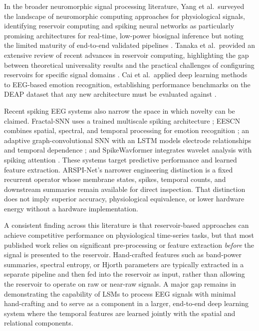 In the broader neuromorphic signal processing literature, Yang et al.\ surveyed the landscape of neuromorphic computing approaches for physiological signals, identifying reservoir computing and spiking neural networks as particularly promising architectures for real-time, low-power biosignal inference but noting the limited maturity of end-to-end validated pipelines \cite{yang_neuromorphic_2023}. Tanaka et al.\ provided an extensive review of recent advances in reservoir computing, highlighting the gap between theoretical universality results and the practical challenges of configuring reservoirs for specific signal domains \cite{tanaka_recent_2019}. Cai et al.\ applied deep learning methods to EEG-based emotion recognition, establishing performance benchmarks on the DEAP dataset that any new architecture must be evaluated against \cite{cai_eeg-based_2024}.

Recent spiking EEG systems also narrow the space in which novelty can be claimed. Fractal-SNN uses a trained multiscale spiking architecture \cite{li_fractal_snn_2023}; EESCN combines spatial, spectral, and temporal processing for emotion recognition \cite{xu_eescn_2024}; an adaptive graph-convolutional SNN with an LSTM models electrode relationships and temporal dependence \cite{gong_adaptive_graph_snn_2023}; and SpikeWavformer integrates wavelet analysis with spiking attention \cite{yuan_spikewavformer_2025}. These systems target predictive performance and learned feature extraction. ARSPI-Net's narrower engineering distinction is a fixed recurrent operator whose membrane states, spikes, temporal counts, and downstream summaries remain available for direct inspection. That distinction does not imply superior accuracy, physiological equivalence, or lower hardware energy without a hardware implementation.

A consistent finding across this literature is that reservoir-based approaches can achieve competitive performance on physiological time-series tasks, but that most published work relies on significant pre-processing or feature extraction \emph{before} the signal is presented to the reservoir. Hand-crafted features such as band-power summaries, spectral entropy, or Hjorth parameters are typically extracted in a separate pipeline and then fed into the reservoir as input, rather than allowing the reservoir to operate on raw or near-raw signals. A major gap remains in demonstrating the capability of LSMs to process EEG signals with minimal hand-crafting and to serve as a component in a larger, end-to-end deep learning system where the temporal features are learned jointly with the spatial and relational components.

